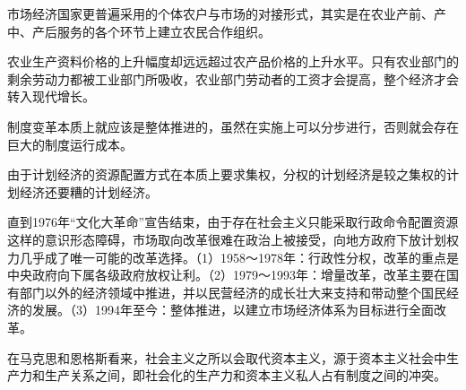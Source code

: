\begin{itemize*}
	\item 市场经济国家更普遍采用的个体农户与市场的对接形式，其实是在农业产前、产中、产后服务的各个环节上建立农民合作组织。
	\item 农业生产资料价格的上升幅度却远远超过农产品价格的上升水平。只有农业部门的剩余劳动力都被工业部门所吸收，农业部门劳动者的工资才会提高，整个经济才会转入现代增长。
	\item 制度变革本质上就应该是整体推进的，虽然在实施上可以分步进行，否则就会存在巨大的制度运行成本。
	\item 由于计划经济的资源配置方式在本质上要求集权，分权的计划经济是较之集权的计划经济还要糟的计划经济。
	\item 直到1976年“文化大革命”宣告结束，由于存在社会主义只能采取行政命令配置资源这样的意识形态障碍，市场取向改革很难在政治上被接受，向地方政府下放计划权力几乎成了唯一可能的改革选择。（1）1958～1978年：行政性分权，改革的重点是中央政府向下属各级政府放权让利。（2）1979～1993年：增量改革，改革主要在国有部门以外的经济领域中推进，并以民营经济的成长壮大来支持和带动整个国民经济的发展。（3）1994年至今：整体推进，以建立市场经济体系为目标进行全面改革。
	\item 在马克思和恩格斯看来，社会主义之所以会取代资本主义，源于资本主义社会中生产力和生产关系之间，即社会化的生产力和资本主义私人占有制度之间的冲突。
\end{itemize*}